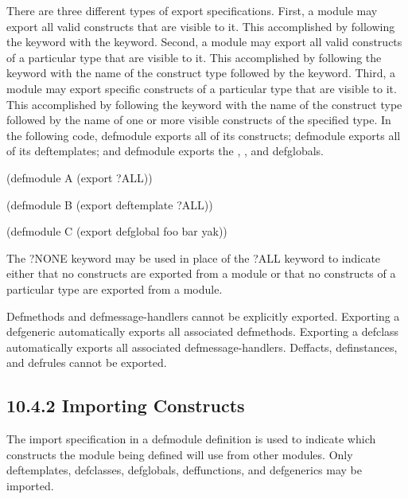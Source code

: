 \documentclass[letterpaper,10pt,english]{sphinxmanual}
\begin{document}
There are three different types of export specifications. First, a
module may export all valid constructs that are visible to it. This
accomplished by following the  keyword with the  keyword.
Second, a module may export all valid constructs of a particular type
that are visible to it. This accomplished by following the 
keyword with the name of the construct type followed by the 
keyword. Third, a module may export specific constructs of a particular
type that are visible to it. This accomplished by following the 
keyword with the name of the construct type followed by the name of one
or more visible constructs of the specified type. In the following code,
defmodule  exports all of its constructs; defmodule  exports all
of its deftemplates; and defmodule  exports the , , and
 defglobals.

\begin{sphinxVerbatim}[commandchars=\\\{\}]
(defmodule A (export ?ALL))

(defmodule B (export deftemplate ?ALL))

(defmodule C (export defglobal foo bar yak))
\end{sphinxVerbatim}

The ?NONE keyword may be used in place of the ?ALL keyword to indicate
either that no constructs are exported from a module or that no
constructs of a particular type are exported from a module.

Defmethods and defmessage-handlers cannot be explicitly exported.
Exporting a defgeneric automatically exports all associated defmethods.
Exporting a defclass automatically exports all associated
defmessage-handlers. Deffacts, definstances, and defrules cannot be
exported.


\subsection{10.4.2 Importing Constructs}
\label{\detokenize{defmodule:importing-constructs}}
The import specification in a defmodule definition is used to indicate
which constructs the module being defined will use from other modules.
Only deftemplates, defclasses, defglobals, deffunctions, and defgenerics
may be imported.
\end{document}
